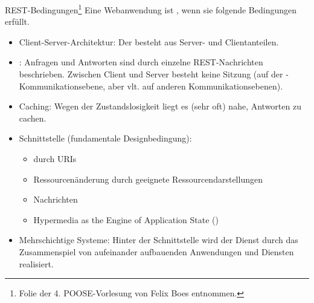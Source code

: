 \documentclass[12pt, aspectratio=169, usepdftitle=false]{beamer}
\begin{document}
\begin{frame}{REST-Bedingungen\footnote{Folie der 4. POOSE-Vorlesung von Felix Boes entnommen.}}
    \vspace{-0.3ex}
    Eine Webanwendung ist , wenn sie folgende Bedingungen erfüllt. \pause
    \begin{itemize}
      \item Client-Server-Architektur: Der  besteht aus Server- und Clientanteilen. \pause
      \item {}: Anfragen und Antworten sind durch einzelne REST-Nachrichten  beschrieben. \pause
        Zwischen Client und Server besteht keine Sitzung (auf der -Kommunikationsebene, aber vlt. auf anderen Kommunikationsebenen). \pause
      \item Caching: Wegen der Zustandslosigkeit liegt es (sehr oft) nahe, Antworten zu cachen. \pause
      \item {} Schnittstelle (fundamentale Designbedingung):
        \begin{itemize}
          \item {} durch URIs \pause
          \item Ressourcenänderung durch geeignete Ressourcendarstellungen \pause
          \item {} Nachrichten \pause
          \item Hypermedia as the Engine of Application State () \pause
        \end{itemize}
      \item Mehrschichtige Systeme: Hinter der Schnittstelle wird der Dienst durch das Zusammenspiel von aufeinander aufbauenden Anwendungen und Diensten realisiert.
    \end{itemize}
  \end{frame}
\end{document}
